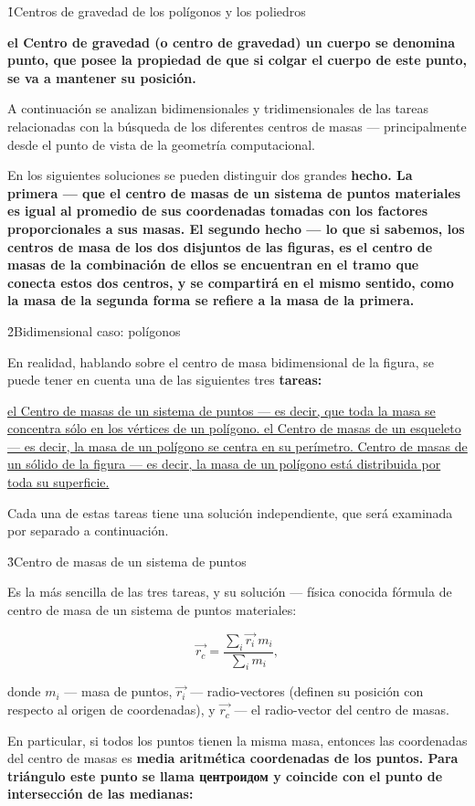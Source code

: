 \h1{Centros de gravedad de los polígonos y los poliedros}

\bf{el Centro de gravedad} (o \bf{centro de gravedad}) un cuerpo se denomina punto, que posee la propiedad de que si colgar el cuerpo de este punto, se va a mantener su posición.

A continuación se analizan bidimensionales y tridimensionales de las tareas relacionadas con la búsqueda de los diferentes centros de masas --- principalmente desde el punto de vista de la geometría computacional.

En los siguientes soluciones se pueden distinguir dos grandes \bf{hecho}. La primera --- que el centro de masas de un sistema de puntos materiales es igual al promedio de sus coordenadas tomadas con los factores proporcionales a sus masas. El segundo hecho --- lo que si sabemos, los centros de masa de los dos disjuntos de las figuras, es el centro de masas de la combinación de ellos se encuentran en el tramo que conecta estos dos centros, y se compartirá en el mismo sentido, como la masa de la segunda forma se refiere a la masa de la primera.


\h2{Bidimensional caso: polígonos}

En realidad, hablando sobre el centro de masa bidimensional de la figura, se puede tener en cuenta una de las siguientes tres \bf{tareas}:

\ul{
\li el Centro de masas de un sistema de puntos --- es decir, que toda la masa se concentra sólo en los vértices de un polígono.
\li el Centro de masas de un esqueleto --- es decir, la masa de un polígono se centra en su perímetro.
\li Centro de masas de un sólido de la figura --- es decir, la masa de un polígono está distribuida por toda su superficie.
}

Cada una de estas tareas tiene una solución independiente, que será examinada por separado a continuación.


\h3{Centro de masas de un sistema de puntos}

Es la más sencilla de las tres tareas, y su solución --- física conocida fórmula de centro de masa de un sistema de puntos materiales:

$$ \vec{r_c} = \frac{ \sum\limits_i \vec{r_i} ~ m_i }{ \sum\limits_i m_i }, $$

donde $m_i$ --- masa de puntos, $\vec{r_i}$ --- radio-vectores (definen su posición con respecto al origen de coordenadas), y $\vec{r_c}$ --- el radio-vector del centro de masas.

En particular, si todos los puntos tienen la misma masa, entonces las coordenadas del centro de masas es \bf{media aritmética} coordenadas de los puntos. Para \bf{triángulo} este punto se llama \bf{центроидом} y coincide con el punto de intersección de las medianas:

